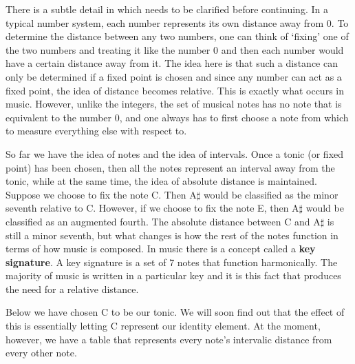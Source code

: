 \documentclass[12pt, a4paper]{article}
\begin{document}
\newpage

    There is a subtle detail in which needs to be clarified before continuing. In a typical number system, each number represents its own distance away from 0. To determine the distance between any two numbers, one can think of `fixing' one of the two numbers and treating it like the number 0 and then each number would have a certain distance away from it. The idea here is that such a distance can only be determined if a fixed point is chosen and since any number can act as a fixed point, the idea of distance becomes relative. This is exactly what occurs in music. However, unlike the integers, the set of musical notes has no note that is equivalent to the number 0, and one always has to first choose a note from which to measure everything else with respect to.\par
    
\vspace{4mm}
    
    So far we have the idea of notes and the idea of intervals. Once a tonic (or fixed point) has been chosen, then all the notes represent an interval away from the tonic, while at the same time, the idea of absolute distance is maintained. Suppose we choose to fix the note C. Then A$\sharp$ would be classified as the minor seventh relative to C. However, if we choose to fix the note E, then A$\sharp$ would be classified as an augmented fourth. The absolute distance between C and A$\sharp$ is still a minor seventh, but what changes is how the rest of the notes function in terms of how music is composed. In music there is a concept called a \textbf{key signature}. A key signature is a set of 7 notes that function harmonically. The majority of music is written in a particular key and it is this fact that produces the need for a relative distance.
    
\vspace{4mm}

    Below we have chosen C to be our tonic. We will soon find out that the effect of this is essentially letting C represent our identity element. At the moment, however, we have a table that represents every note's intervalic distance from every other note.


    
\vspace{6mm}
\end{document}
